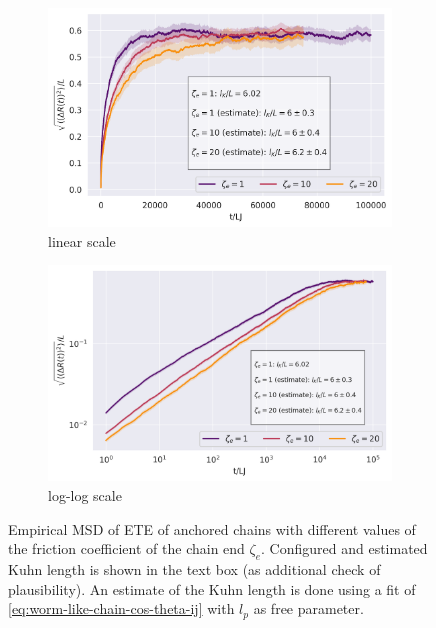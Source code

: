 \documentclass[
    paper=A4,pagesize=automedia,fontsize=12pt,
    BCOR=15mm,DIV=22,
    twoside,headinclude,footinclude=false,
    fleqn,             %
    bibliography=totocnumbered,          %
    listof=totoc,                %
    listof=flat,                 %
    cleardoublepage=empty      %
    numbers=endperiod
]{scrartcl}
\begin{document}
\begin{figure}
    \centering
    \begin{subfigure}[b]{\textwidth}
        \centering
        \includegraphics[width=\textwidth]{14+15+16-exp-msd.png}
        \caption{linear scale}
        \label{fig:msd_anchored_zeta-normal}
    \end{subfigure}
    \begin{subfigure}[b]{\textwidth}
        \centering
        \includegraphics[width=\textwidth]{14+15+16-exp-msd-log.png}
        \caption{log-log scale}
        \label{fig:msd_anchored_zeta-log}
    \end{subfigure}
    \caption{Empirical MSD of ETE of anchored chains with different values of
    the friction coefficient of the chain end $\zeta_e$. 
    Configured and estimated Kuhn length is shown in the text box (as
    additional check of plausibility).
    An estimate of the Kuhn length is done using a fit of 
    \autoref{eq:worm-like-chain-cos-theta-ij} with $l_p$ as free parameter.
    }
    \label{fig:msd_anchored_zeta}
\end{figure}
\end{document}

